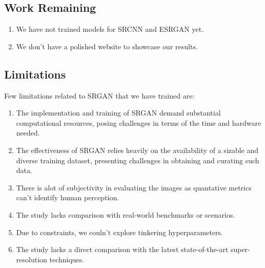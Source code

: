 \subsection{Work Remaining}
\begin{enumerate}
    \item We have not trained models for SRCNN and ESRGAN yet.
    \item We don't have a polished website to showcase our results.
\end{enumerate}  
\subsection{Limitations}
Few limitations related to SRGAN that we have trained are:
\begin{enumerate}
    \item The implementation and training of SRGAN demand substantial computational resources, posing challenges in terms of the time and hardware needed.
    \item  The effectiveness of SRGAN relies heavily on the availability of a sizable and diverse training dataset, presenting challenges in obtaining and curating such data.
    \item There is alot of subjectivity in evaluating the images as quantative metrics can't identify human perception.
    \item  The study lacks comparison with real-world benchmarks or scenarios.
    \item Due to constraints, we couln't explore tinkering hyperparameters.
    \item The study lacks a direct comparison with the latest state-of-the-art super-resolution techniques.
\end{enumerate}
